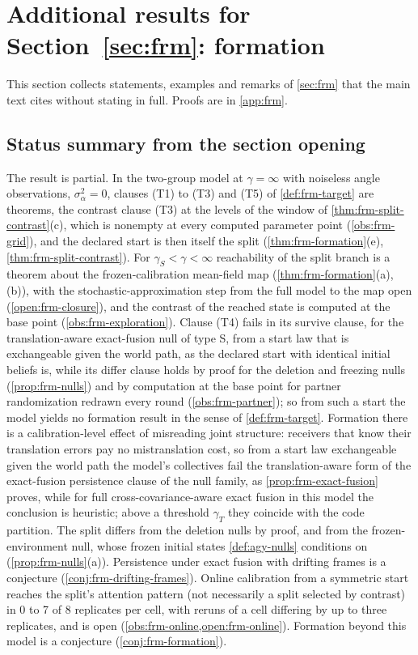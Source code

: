 \section{Additional results for \texorpdfstring{Section~\ref{sec:frm}}{Section 7}: formation}\label{sup:frm}

This section collects statements, examples and remarks of \cref{sec:frm} that the main text cites without stating in full. Proofs are in \cref{app:frm}.

\subsection{Status summary from the section opening}\label{sup:frm-status-summary-from-the-section-opening}

The result is partial. In the two-group model at $\gamma=\infty$ with noiseless angle observations, $\sigma_\alpha^2=0$, clauses (T1) to (T3) and (T5) of \cref{def:frm-target} are theorems, the contrast clause (T3) at the levels of the window of \cref{thm:frm-split-contrast}(c), which is nonempty at every computed parameter point (\cref{obs:frm-grid}), and the declared start is then itself the split (\cref{thm:frm-formation}(e), \cref{thm:frm-split-contrast}). For $\gamma_S<\gamma<\infty$ reachability of the split branch is a theorem about the frozen-calibration mean-field map (\cref{thm:frm-formation}(a),(b)), with the stochastic-approximation step from the full model to the map open (\cref{open:frm-closure}), and the contrast of the reached state is computed at the base point (\cref{obs:frm-exploration}). Clause (T4) fails in its survive clause, for the translation-aware exact-fusion null of type S, from a start law that is exchangeable given the world path, as the declared start with identical initial beliefs is, while its differ clause holds by proof for the deletion and freezing nulls (\cref{prop:frm-nulls}) and by computation at the base point for partner randomization redrawn every round (\cref{obs:frm-partner}); so from such a start the model yields no formation result in the sense of \cref{def:frm-target}. Formation there is a calibration-level effect of misreading joint structure: receivers that know their translation errors pay no mistranslation cost, so from a start law exchangeable given the world path the model's collectives fail the translation-aware form of the exact-fusion persistence clause of the null family, as \cref{prop:frm-exact-fusion} proves, while for full cross-covariance-aware exact fusion in this model the conclusion is heuristic; above a threshold $\gamma_T$ they coincide with the code partition. The split differs from the deletion nulls by proof, and from the frozen-environment null, whose frozen initial states \cref{def:agy-nulls} conditions on (\cref{prop:frm-nulls}(a)). Persistence under exact fusion with drifting frames is a conjecture (\cref{conj:frm-drifting-frames}). Online calibration from a symmetric start reaches the split's attention pattern (not necessarily a split selected by contrast) in 0 to 7 of 8 replicates per cell, with reruns of a cell differing by up to three replicates, and is open (\cref{obs:frm-online,open:frm-online}). Formation beyond this model is a conjecture (\cref{conj:frm-formation}).

